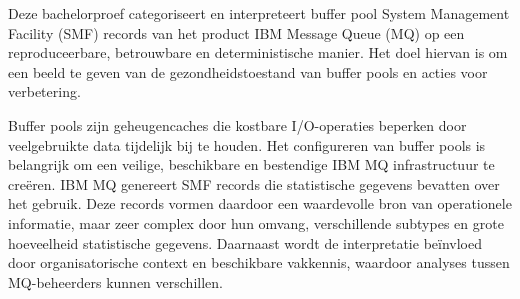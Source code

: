 
%
%
%
%
%

%


Deze bachelorproef categoriseert en interpreteert buffer pool System Management Facility (SMF) records van het product IBM Message Queue (MQ) op een reproduceerbare, betrouwbare 
en deterministische manier. Het doel hiervan is om een beeld te geven van de gezondheidstoestand van buffer pools en acties voor verbetering. 

Buffer pools zijn geheugencaches die kostbare I/O-operaties beperken door veelgebruikte data tijdelijk bij te houden. Het configureren
van buffer pools is belangrijk om een veilige, beschikbare en bestendige IBM MQ infrastructuur te creëren. IBM MQ genereert SMF records die statistische gegevens bevatten over het gebruik. 
Deze records vormen daardoor een waardevolle bron van operationele informatie, maar zeer complex door hun omvang, verschillende subtypes en grote hoeveelheid statistische gegevens. Daarnaast wordt de interpretatie beïnvloed door organisatorische context en beschikbare vakkennis, waardoor analyses tussen MQ-beheerders kunnen verschillen. 

